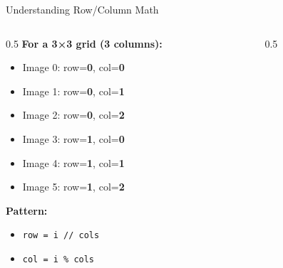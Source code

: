 \documentclass{csbeamer}
\begin{document}
\begin{frame}{Understanding Row/Column Math}
    \begin{columns}
    \begin{column}{0.5\textwidth}
        \textbf{For a 3×3 grid (3 columns):}
        \begin{itemize}\small
            \item Image 0: row=\textbf{0}, col=\textbf{0}
            \item Image 1: row=\textbf{0}, col=\textbf{1}
            \item Image 2: row=\textbf{0}, col=\textbf{2}
            \item Image 3: row=\textbf{1}, col=\textbf{0}
            \item Image 4: row=\textbf{1}, col=\textbf{1}
            \item Image 5: row=\textbf{1}, col=\textbf{2}
        \end{itemize}

        \vspace{0.5em}

        \textbf{Pattern:}
        \begin{itemize}\small
            \item \texttt{row = i // cols}
            \item \texttt{col = i \% cols}
        \end{itemize}
    \end{column}
    \begin{column}{0.5\textwidth}
    \end{column}
    \end{columns}
\end{frame}
\end{document}
